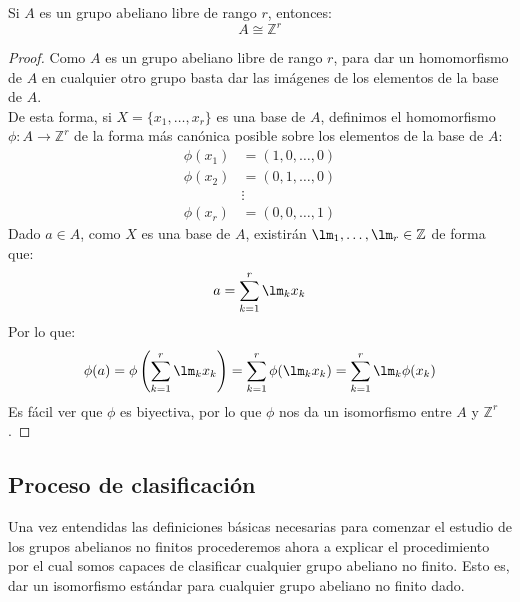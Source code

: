 \begin{prop}
    Si $A$ es un grupo abeliano libre de rango $r$, entonces:
    \begin{equation*}
        A\cong \mathbb{Z}^r
    \end{equation*}
    \begin{proof}
        Como $A$ es un grupo abeliano libre de rango $r$, para dar un homomorfismo de $A$ en cualquier otro grupo basta dar las imágenes de los elementos de la base de $A$.\\

        \noindent
        De esta forma, si $X = \{x_1,\ldots,x_r\}$ es una base de $A$, definimos el homomorfismo $\phi:A\to \mathbb{Z}^r$ de la forma más canónica posible sobre los elementos de la base de $A$:
        \begin{align*}
            \phi(x_1) &= (1, 0, \ldots, 0) \\
            \phi(x_2) &= (0, 1, \ldots, 0) \\
                      &\vdots \\
            \phi(x_r) &= (0, 0, \ldots, 1)
        \end{align*}
        Dado $a\in A$, como $X$ es una base de $A$, existirán $\lm_1,\ldots,\lm_r\in \mathbb{Z}$ de forma que:
        \begin{equation*}
            a = \sum_{k=1}^{r}\lm_kx_k
        \end{equation*}
        Por lo que:
        \begin{equation*}
            \phi(a) = \phi\left(\sum_{k=1}^{r}\lm_kx_k\right) = \sum_{k=1}^{r}\phi(\lm_kx_k) = \sum_{k=1}^{r}\lm_k \phi(x_k)
        \end{equation*}
        Es fácil ver que $\phi$ es biyectiva, por lo que $\phi$ nos da un isomorfismo entre $A$ y $\mathbb{Z}^r$.
    \end{proof}
\end{prop}

\subsection{Proceso de clasificación}
\noindent
Una vez entendidas las definiciones básicas necesarias para comenzar el estudio de los grupos abelianos no finitos procederemos ahora a explicar el procedimiento por el cual somos capaces de clasificar cualquier grupo abeliano no finito. Esto es, dar un isomorfismo estándar para cualquier grupo abeliano no finito dado.\\

